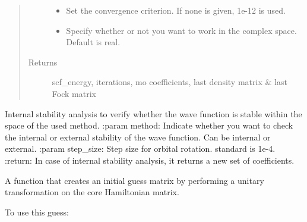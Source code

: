 \documentclass[letterpaper,10pt,english]{sphinxmanual}
\begin{document}
\begin{fulllineitems}
\begin{fulllineitems}
\begin{quote}
\begin{description}
\begin{itemize}
\item {} 
 \textendash{} Set the convergence criterion. If none is given, 1e-12 is used.

\item {} 
 \textendash{} Specify whether or not you want to work in the complex space. Default is real.

\end{itemize}

\item[{Returns}] \leavevmode
scf\_energy, iterations, mo coefficients, last density matrix \& last Fock matrix

\end{description}\end{quote}

\end{fulllineitems}


\begin{fulllineitems}
\label{\detokenize{GHF:hf.GHF.GHF.stability_analysis}}
Internal stability analysis to verify whether the wave function is stable within the space of the used method.
:param method: Indicate whether you want to check the internal or external stability of the wave function. Can
be internal or external.
:param step\_size: Step size for orbital rotation. standard is 1e-4.
:return: In case of internal stability analysis, it returns a new set of coefficients.

\end{fulllineitems}


\begin{fulllineitems}
\label{\detokenize{GHF:hf.GHF.GHF.unitary_rotation_guess}}
A function that creates an initial guess matrix by performing a unitary transformation on the core Hamiltonian
matrix.

To use this guess:


\end{fulllineitems}
\end{fulllineitems}
\end{document}
